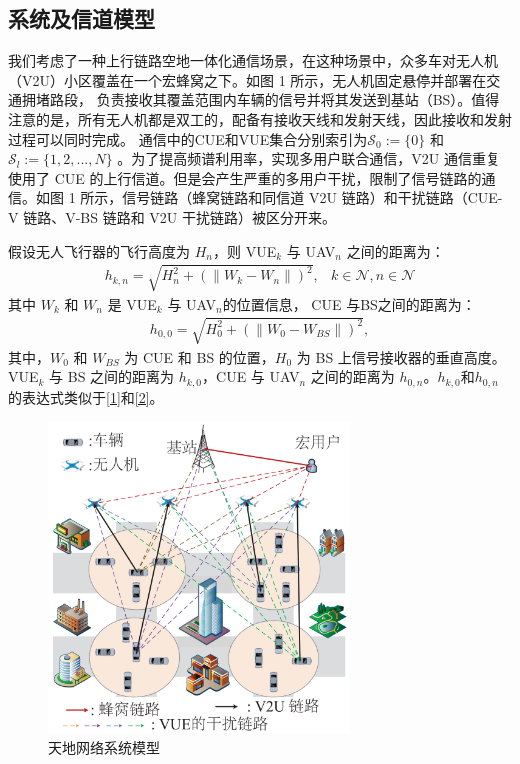 \subsection{系统及信道模型}\label{section2-2-1}
我们考虑了一种上行链路空地一体化通信场景，在这种场景中，众多车对无人机（V2U）小区覆盖在一个宏蜂窝之下。如图 1 所示，无人机固定悬停并部署在交通拥堵路段，
负责接收其覆盖范围内车辆的信号并将其发送到基站（BS）。值得注意的是，所有无人机都是双工的，配备有接收天线和发射天线，因此接收和发射过程可以同时完成。
通信中的CUE和VUE集合分别索引为$\mathcal{S}_0:= \{0\}$ 和$\mathcal{S}_l:=\{1, 2,..., N\}$ 。为了提高频谱利用率，实现多用户联合通信，V2U 通信重复使用了
CUE 的上行信道。但是会产生严重的多用户干扰，限制了信号链路的通信。如图 1 所示，信号链路（蜂窝链路和同信道 V2U 链路）和干扰链路（CUE-V 链路、V-BS 链路和 V2U 干扰链路）被区分开来。

假设无人飞行器的飞行高度为 $H_n$，则 VUE$_{k}$ 与 UAV$_{n}$ 之间的距离为：
\begin{eqnarray}\label{1}
h_{k,n}=\sqrt{H_n^2+(\|W_k-W_n\|)^2},           &k\in \mathcal{N}, n\in \mathcal{N}
\end{eqnarray}
其中 $W_k$ 和 $W_n$ 是 VUE$_{k}$ 与 UAV$_{n}$的位置信息，  CUE 与BS之间的距离为：
\begin{eqnarray}\label{2}
h_{0,0}=\sqrt{H_0^2+(\|W_0-W_{BS}\|)^2},
\end{eqnarray}
其中，$W_0$ 和 $W_{BS}$ 为 CUE 和 BS 的位置，$H_0$ 为 BS 上信号接收器的垂直高度。VUE$_{k}$ 与 BS 之间的距离为 $h_{k,0}$，CUE 与 UAV$_{n}$ 之间的距离为 $h_{0,n}$。$h_{k,0}$和$h_{0,n}$的表达式类似于\eqref{1}和\eqref{2}。

\begin{figure}[H]
\centering
\includegraphics[width=8cm]{figures//chap2//china1.pdf}
\caption{天地网络系统模型}
\label{F1}
\end{figure}

